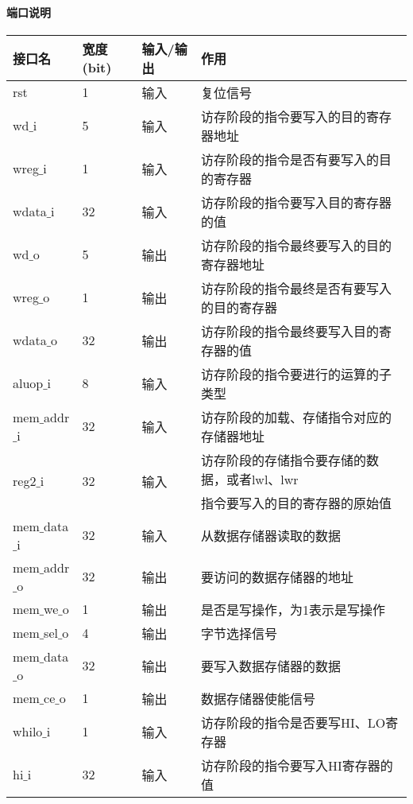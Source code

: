 \paragraph{端口说明}
\quad

\quad
	\begin{longtable}{|l|l|l|l|}
		\hline
		接口名 & 宽度(bit) & 输入/输出 & 作用 \\
		\hline
		rst & 1 & 输入 & 复位信号 \\
		\hline
		wd$\_$i & 5 & 输入 & 访存阶段的指令要写入的目的寄存器地址 \\
		\hline
		wreg$\_$i & 1 & 输入 & 访存阶段的指令是否有要写入的目的寄存器 \\
		\hline
		wdata$\_$i & 32 & 输入 & 访存阶段的指令要写入目的寄存器的值 \\
		\hline
		wd$\_$o & 5 & 输出 & 访存阶段的指令最终要写入的目的寄存器地址 \\
		\hline
		wreg$\_$o & 1 & 输出 & 访存阶段的指令最终是否有要写入的目的寄存器 \\
		\hline
		wdata$\_$o & 32 & 输出 & 访存阶段的指令最终要写入目的寄存器的值 \\
		\hline
		aluop$\_$i & 8 & 输入 & 访存阶段的指令要进行的运算的子类型 \\
		\hline
		mem$\_$addr$\_$i & 32 & 输入 & 访存阶段的加载、存储指令对应的存储器地址 \\
		\hline
		\multirow{2}{*}{reg2$\_$i} & \multirow{2}{*}{32} & \multirow{2}{*}{输入} & 访存阶段的存储指令要存储的数据，或者lwl、lwr \\
		& & & 指令要写入的目的寄存器的原始值 \\
		\hline
		mem$\_$data$\_$i & 32 & 输入 & 从数据存储器读取的数据 \\
		\hline
		mem$\_$addr$\_$o & 32 & 输出 & 要访问的数据存储器的地址 \\
		\hline
		mem$\_$we$\_$o & 1 & 输出 & 是否是写操作，为1表示是写操作 \\
		\hline
		mem$\_$sel$\_$o & 4 & 输出 & 字节选择信号 \\
		\hline
		mem$\_$data$\_$o & 32 & 输出 & 要写入数据存储器的数据 \\
		\hline
		mem$\_$ce$\_$o & 1 & 输出 & 数据存储器使能信号 \\
		\hline
		whilo$\_$i & 1 & 输入 & 访存阶段的指令是否要写HI、LO寄存器 \\
		\hline
		hi$\_$i & 32 & 输入 & 访存阶段的指令要写入HI寄存器的值 \\

\end{longtable}
